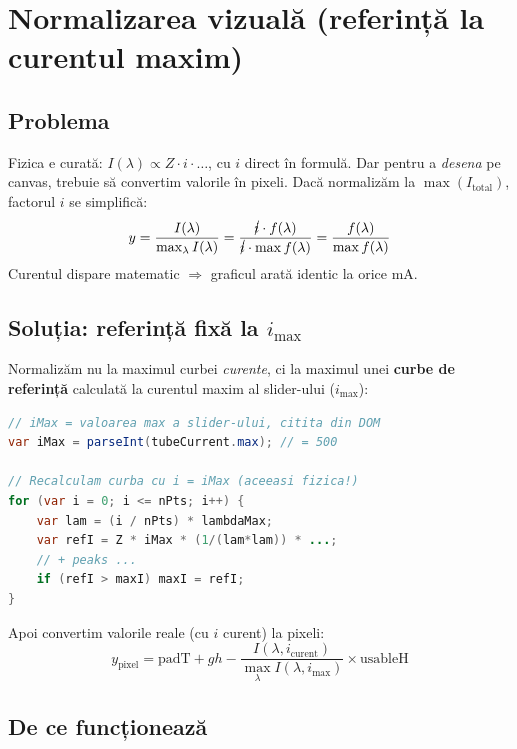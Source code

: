 \documentclass[12pt,a4paper]{article}
\begin{document}
\section{Normalizarea vizuală (referință la curentul maxim)}

\subsection{Problema}

Fizica e curată: $I(\lambda) \propto Z \cdot i \cdot \ldots$, cu $i$ direct în formulă. Dar pentru a \emph{desena} pe canvas, trebuie să convertim valorile în pixeli. Dacă normalizăm la $\max(I_{\text{total}})$, factorul $i$ se simplifică:
\[
    y = \frac{I(\lambda)}{\max_\lambda I(\lambda)} = \frac{\cancel{i} \cdot f(\lambda)}{\cancel{i} \cdot \max f(\lambda)} = \frac{f(\lambda)}{\max f(\lambda)}
\]
Curentul dispare matematic $\Rightarrow$ graficul arată identic la orice mA.

\subsection{Soluția: referință fixă la $i_{\max}$}

Normalizăm nu la maximul curbei \emph{curente}, ci la maximul unei \textbf{curbe de referință} calculată la curentul maxim al slider-ului ($i_{\max}$):

\begin{lstlisting}[language=Java]
// iMax = valoarea max a slider-ului, citita din DOM
var iMax = parseInt(tubeCurrent.max); // = 500

// Recalculam curba cu i = iMax (aceeasi fizica!)
for (var i = 0; i <= nPts; i++) {
    var lam = (i / nPts) * lambdaMax;
    var refI = Z * iMax * (1/(lam*lam)) * ...;
    // + peaks ...
    if (refI > maxI) maxI = refI;
}
\end{lstlisting}

Apoi convertim valorile reale (cu $i$ curent) la pixeli:
\begin{equation}
    y_{\text{pixel}} = \text{padT} + gh - \frac{I(\lambda, i_{\text{curent}})}{\max_\lambda I(\lambda, i_{\max})} \times \text{usableH}
\end{equation}

\subsection{De ce funcționează}
\end{document}
